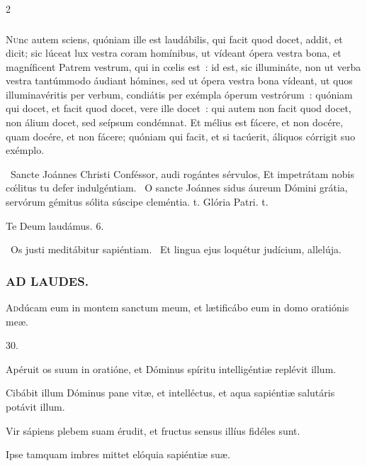 \documentclass[9pt,twoside]{extarticle}
\begin{document}
\begin{multicols}{2}
\subsubsection*{\center{}}
\lettrine{N}unc autem sciens, quóniam ille est laudábilis, qui facit quod docet, addit, et dicit; sic lúceat lux vestra coram homínibus, ut vídeant ópera vestra bona, et magníficent Patrem vestrum, qui in cœlis est~: id est, sic illumináte, non ut verba vestra tantúmmodo áudiant hómines, sed ut ópera vestra bona vídeant, ut quos illuminavéritis per verbum, condiátis per exémpla óperum vestrórum~: quóniam qui docet, et facit quod docet, vere ille docet~: qui autem non facit quod docet, non álium docet, sed seípsum condémnat. Et mélius est fácere, et non docére, quam docére, et non fácere; quóniam qui facit, et si tacúerit, áliquos córrigit suo exémplo.\\

\begin{tightlist}{}
\item {}~Sancte Joánnes Christi Conféssor, audi rogántes sérvulos, \textred{*} Et impetrátam nobis cœ́litus tu defer indulgéntiam. ~O sancte Joánnes sidus áureum Dómini grátia, servórum gémitus sólita súscipe cleméntia. t. Glória Patri. t.
\item Te Deum laudámus. 6. 
\item {}~Os justi meditábitur sapiéntiam. ~Et lingua ejus loquétur judícium, allelúja.
\end{tightlist}

\subsubsection*{\center \textsc{AD LAUDES.}}
\begin{center}\end{center}
\lettrine{A}ddúcam eum in montem sanctum meum, et lætificábo eum in domo oratiónis meæ.

\begin{tightlist}{}
\item {} 30.
\item {} Apéruit os suum in oratióne, et Dóminus spíritu intelligéntiæ replévit illum.
\item {} Cibábit illum Dóminus pane vitæ, et intelléctus, et aqua sapiéntiæ salutáris potávit illum.
\item {} Vir sápiens plebem suam érudit, et fructus sensus illíus fidéles sunt.
\item {} Ipse tamquam imbres mittet elóquia sapiéntiæ suæ.
\end{tightlist}


\end{multicols}
\end{document}
